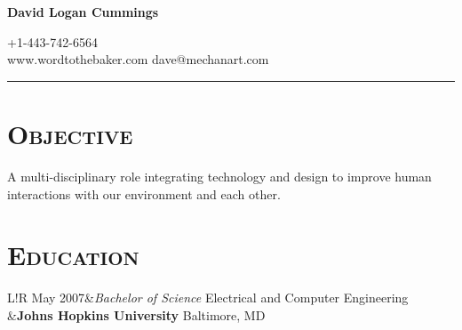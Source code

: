 \documentclass[10pt, letterpaper]{article}
\newcommand\VRule{\color{lightgray}\vrule width 0.5pt}
\begin{document}
\centerline{\Large\bf David Logan Cummings}
\hfill +1-443-742-6564 \\
www.wordtothebaker.com \hfill dave@mechanart.com
\vspace{1em}
\hrule height 1pt

\section*{\textsc{\textbf{Objective}}} 
\begin{adjustwidth}{2.5em}{0pt}
  A multi-disciplinary role integrating technology and design to 
improve human interactions with our environment and each other.
\end{adjustwidth}

\section*{\textbf{\textsc{Education}}} 
\begin{tabular}{L!{\VRule}R}
  May 2007&{\sl Bachelor of Science}  \hfill Electrical and Computer Engineering \\
          &\textbf{Johns Hopkins University}  \hfill Baltimore, MD \\
\end{tabular}
\end{document}
